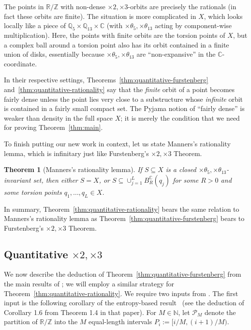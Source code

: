 \documentclass[11pt]{amsart}
\newtheorem{theorem}[lemma]{Theorem}
\theoremstyle{definition}
\newcommand{\C}{{\mathbb C}}
\begin{document}
The points in $\mathbb{R}/\mathbb{Z}$ with non-dense $\times 2, \times 3$-orbits are precisely the rationals (in fact these orbits are finite).  The situation is more complicated in $X$, which looks locally like a piece of $\mathbb{Q}_5 \times \mathbb{Q}_{13} \times \C$ (with $\times \theta_5, \times \theta_{13}$ acting by component-wise multiplication).  Here, the points with finite orbits are the torsion points of $X$, but a complex ball around a torsion point also has its orbit contained in a finite union of disks, essentially because $\times \theta_5, \times \theta_{13}$ are ``non-expansive'' in the $\mathbb{C}$-coordinate.

In their respective settings, Theorems~\ref{thm:quantitative-furstenberg} and~\ref{thm:quantitative-rationality} say that the \emph{finite} orbit of a point becomes fairly dense unless the point lies very close to a substructure whose \emph{infinite} orbit is contained in a fairly small compact set.  The Pyjama notion of ``fairly dense'' is weaker than density in the full space $X$; it is merely the condition that we need for proving Theorem~\ref{thm:main}.

To finish putting our new work in context, let us state Manners's rationality lemma, which is infinitary just like Furstenberg's $\times 2, \times 3$ Theorem.
\begin{theorem}[Manners's rationality lemma]
If $S \subseteq X$ is a closed $\times \theta_5,\times \theta_{13}$-invariant set, then either $S = X$, or $S \subseteq \cup_{j = 1}^L B_R^\mathbb{C}(q_j)$ for some $R > 0$ and some torsion points $q_1, \dots, q_L \in X$.
\end{theorem}
In summary, Theorem~\ref{thm:quantitative-rationality} bears the same relation to Manners's rationality lemma as Theorem~\ref{thm:quantitative-furstenberg} bears to Furstenberg's $\times 2, \times 3$ Theorem.


\subsection{Quantitative $\times 2, \times 3$}

We now describe the deduction of Theorem~\ref{thm:quantitative-furstenberg} from the main results of \cite{BLMV08}; we will employ a similar strategy for Theorem~\ref{thm:quantitative-rationality}.  We require two inputs from \cite{BLMV08}.  
The first input is the following corollary of the entropy-based result~\cite[Theorem 1.4]{BLMV08} (see the deduction of Corollary 1.6 from Theorem 1.4 in that paper).  For $M \in \mathbb{N}$, let $\mathcal{P}_M$ denote the partition of $\mathbb{R}/\mathbb{Z}$ into the $M$ equal-length intervals $P_i:=[i/M, (i+1)/M)$.
\end{document}
